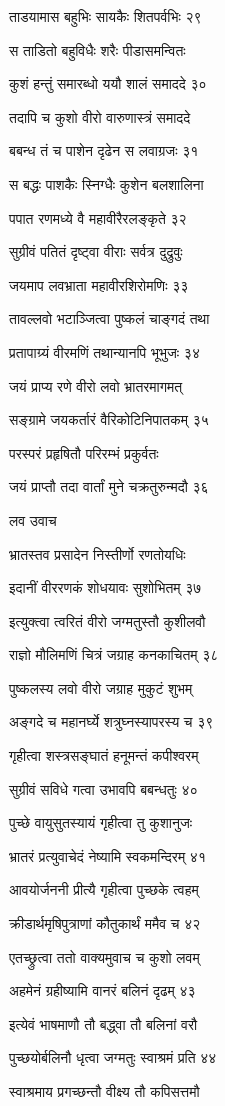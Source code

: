 ताडयामास बहुभिः सायकैः शितपर्वभिः २९

स ताडितो बहुविधैः शरैः पीडासमन्वितः

कुशं हन्तुं समारब्धो ययौ शालं समाददे ३०

तदापि च कुशो वीरो वारुणास्त्रं समाददे

बबन्ध तं च पाशेन दृढेन स लवाग्रजः ३१

स बद्धः पाशकैः स्निग्धैः कुशेन बलशालिना

पपात रणमध्ये वै महावीरैरलङ्कृते ३२

सुग्रीवं पतितं दृष्ट्वा वीराः सर्वत्र दुद्रुवुः

जयमाप लवभ्राता महावीरशिरोमणिः ३३

तावल्लवो भटाञ्जित्वा पुष्कलं चाङ्गदं तथा

प्रतापाग्र्यं वीरमणिं तथान्यानपि भूभुजः ३४

जयं प्राप्य रणे वीरो लवो भ्रातरमागमत्

सङ्ग्रामे जयकर्तारं वैरिकोटिनिपातकम् ३५

परस्परं प्रहृषितौ परिरम्भं प्रकुर्वतः

जयं प्राप्तौ तदा वार्तां मुने चक्रतुरुन्मदौ ३६

लव उवाच

भ्रातस्तव प्रसादेन निस्तीर्णो रणतोयधिः

इदानीं वीररणकं शोधयावः सुशोभितम् ३७

इत्युक्त्वा त्वरितं वीरो जग्मतुस्तौ कुशीलवौ

राज्ञो मौलिमणिं चित्रं जग्राह कनकाचितम् ३८

पुष्कलस्य लवो वीरो जग्राह मुकुटं शुभम्

अङ्गदे च महानर्घ्ये शत्रुघ्नस्यापरस्य च ३९

गृहीत्वा शस्त्रसङ्घातं हनूमन्तं कपीश्वरम्

सुग्रीवं सविधे गत्वा उभावपि बबन्धतुः ४०

पुच्छे वायुसुतस्यायं गृहीत्वा तु कुशानुजः

भ्रातरं प्रत्युवाचेदं नेष्यामि स्वकमन्दिरम् ४१

आवयोर्जननी प्रीत्यै गृहीत्वा पुच्छके त्वहम्

क्रीडार्थमृषिपुत्राणां कौतुकार्थं ममैव च ४२

एतच्छ्रुत्वा ततो वाक्यमुवाच च कुशो लवम्

अहमेनं ग्रहीष्यामि वानरं बलिनं दृढम् ४३

इत्येवं भाषमाणौ तौ बद्ध्वा तौ बलिनां वरौ

पुच्छयोर्बलिनौ धृत्वा जग्मतुः स्वाश्रमं प्रति ४४

स्वाश्रमाय प्रगच्छन्तौ वीक्ष्य तौ कपिसत्तमौ

